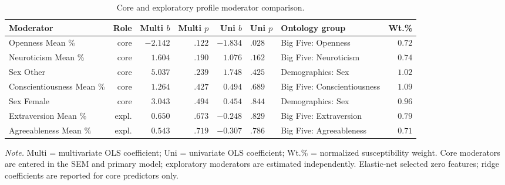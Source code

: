 \begin{table}[htbp]
\centering
\begin{threeparttable}
\caption{Core and exploratory profile moderator comparison.}
\label{tab:moderators}
\small
\setlength{\tabcolsep}{4pt}
\renewcommand{\arraystretch}{1.10}
\begin{tabularx}{\linewidth}{Xrrrrll r}
\toprule
Moderator & Role & Multi $b$ & Multi $p$ & Uni $b$ & Uni $p$ & Ontology group & Wt.\% \\
\midrule
Openness Mean \%      & core & $-2.142$ & $.122$ & $-1.834$ & $.028$ & Big Five: Openness       & $0.72$ \\
Neuroticism Mean \%   & core & $ 1.604$ & $.190$ & $ 1.076$ & $.162$ & Big Five: Neuroticism     & $0.74$ \\
Sex Other             & core & $ 5.037$ & $.239$ & $ 1.748$ & $.425$ & Demographics: Sex        & $1.02$ \\
Conscientiousness Mean \% & core & $ 1.264$ & $.427$ & $ 0.494$ & $.689$ & Big Five: Conscientiousness & $1.09$ \\
Sex Female            & core & $ 3.043$ & $.494$ & $ 0.454$ & $.844$ & Demographics: Sex        & $0.96$ \\
Extraversion Mean \%  & expl. & $ 0.650$ & $.673$ & $-0.248$ & $.829$ & Big Five: Extraversion   & $0.79$ \\
Agreeableness Mean \% & expl. & $ 0.543$ & $.719$ & $-0.307$ & $.786$ & Big Five: Agreeableness  & $0.71$ \\
\bottomrule
\end{tabularx}
\begin{tablenotes}[flushleft]
\footnotesize
\item \textit{Note.} Multi = multivariate OLS coefficient; Uni = univariate OLS coefficient; Wt.\% = normalized susceptibility weight. Core moderators are entered in the SEM and primary model; exploratory moderators are estimated independently. Elastic-net selected zero features; ridge coefficients are reported for core predictors only.
\end{tablenotes}
\end{threeparttable}
\end{table}
